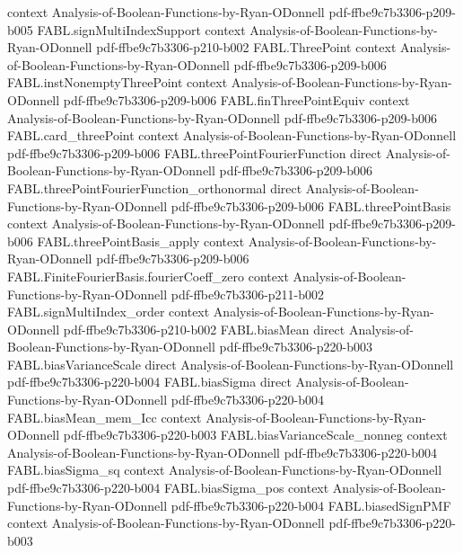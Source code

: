 \begin{theorem}
  {context}
  {Analysis-of-Boolean-Functions-by-Ryan-ODonnell}
  {pdf-ffbe9c7b3306-p209-b005}
\proofstep
  {FABL.signMultiIndexSupport}
  {context}
  {Analysis-of-Boolean-Functions-by-Ryan-ODonnell}
  {pdf-ffbe9c7b3306-p210-b002}
\proofstep
  {FABL.ThreePoint}
  {context}
  {Analysis-of-Boolean-Functions-by-Ryan-ODonnell}
  {pdf-ffbe9c7b3306-p209-b006}
\proofstep
  {FABL.instNonemptyThreePoint}
  {context}
  {Analysis-of-Boolean-Functions-by-Ryan-ODonnell}
  {pdf-ffbe9c7b3306-p209-b006}
\proofstep
  {FABL.finThreePointEquiv}
  {context}
  {Analysis-of-Boolean-Functions-by-Ryan-ODonnell}
  {pdf-ffbe9c7b3306-p209-b006}
\proofstep
  {FABL.card_threePoint}
  {context}
  {Analysis-of-Boolean-Functions-by-Ryan-ODonnell}
  {pdf-ffbe9c7b3306-p209-b006}
\proofstep
  {FABL.threePointFourierFunction}
  {direct}
  {Analysis-of-Boolean-Functions-by-Ryan-ODonnell}
  {pdf-ffbe9c7b3306-p209-b006}
\proofstep
  {FABL.threePointFourierFunction_orthonormal}
  {direct}
  {Analysis-of-Boolean-Functions-by-Ryan-ODonnell}
  {pdf-ffbe9c7b3306-p209-b006}
\proofstep
  {FABL.threePointBasis}
  {context}
  {Analysis-of-Boolean-Functions-by-Ryan-ODonnell}
  {pdf-ffbe9c7b3306-p209-b006}
\proofstep
  {FABL.threePointBasis_apply}
  {context}
  {Analysis-of-Boolean-Functions-by-Ryan-ODonnell}
  {pdf-ffbe9c7b3306-p209-b006}
\proofstep
  {FABL.FiniteFourierBasis.fourierCoeff_zero}
  {context}
  {Analysis-of-Boolean-Functions-by-Ryan-ODonnell}
  {pdf-ffbe9c7b3306-p211-b002}
\proofstep
  {FABL.signMultiIndex_order}
  {context}
  {Analysis-of-Boolean-Functions-by-Ryan-ODonnell}
  {pdf-ffbe9c7b3306-p210-b002}
\proofstep
  {FABL.biasMean}
  {direct}
  {Analysis-of-Boolean-Functions-by-Ryan-ODonnell}
  {pdf-ffbe9c7b3306-p220-b003}
\proofstep
  {FABL.biasVarianceScale}
  {direct}
  {Analysis-of-Boolean-Functions-by-Ryan-ODonnell}
  {pdf-ffbe9c7b3306-p220-b004}
\proofstep
  {FABL.biasSigma}
  {direct}
  {Analysis-of-Boolean-Functions-by-Ryan-ODonnell}
  {pdf-ffbe9c7b3306-p220-b004}
\proofstep
  {FABL.biasMean_mem_Icc}
  {context}
  {Analysis-of-Boolean-Functions-by-Ryan-ODonnell}
  {pdf-ffbe9c7b3306-p220-b003}
\proofstep
  {FABL.biasVarianceScale_nonneg}
  {context}
  {Analysis-of-Boolean-Functions-by-Ryan-ODonnell}
  {pdf-ffbe9c7b3306-p220-b004}
\proofstep
  {FABL.biasSigma_sq}
  {context}
  {Analysis-of-Boolean-Functions-by-Ryan-ODonnell}
  {pdf-ffbe9c7b3306-p220-b004}
\proofstep
  {FABL.biasSigma_pos}
  {context}
  {Analysis-of-Boolean-Functions-by-Ryan-ODonnell}
  {pdf-ffbe9c7b3306-p220-b004}
\proofstep
  {FABL.biasedSignPMF}
  {context}
  {Analysis-of-Boolean-Functions-by-Ryan-ODonnell}
  {pdf-ffbe9c7b3306-p220-b003}

\end{theorem}
